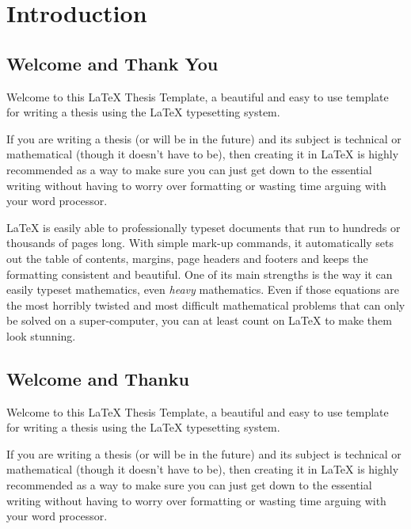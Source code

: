 \chapter{Introduction}\label{ch:chapter1} %



\section{Welcome and Thank You}\label{sec:welcome}
Welcome to this \LaTeX{} Thesis Template, a beautiful and easy to use template for writing a thesis using the \LaTeX{} typesetting system.

If you are writing a thesis (or will be in the future) and its subject is technical or mathematical (though it doesn't have to be), then creating it in \LaTeX{} is highly recommended as a way to make sure you can just get down to the essential writing without having to worry over formatting or wasting time arguing with your word processor.

\LaTeX{} is easily able to professionally typeset documents that run to hundreds or thousands of pages long. With simple mark-up commands, it automatically sets out the table of contents, margins, page headers and footers and keeps the formatting consistent and beautiful. One of its main strengths is the way it can easily typeset mathematics, even \emph{heavy} mathematics. Even if those equations are the most horribly twisted and most difficult mathematical problems that can only be solved on a super-computer, you can at least count on \LaTeX{} to make them look stunning.


\section{Welcome and Thanku}\label{sec:welome}
Welcome to this \LaTeX{} Thesis Template, a beautiful and easy to use template for writing a thesis using the \LaTeX{} typesetting system.

If you are writing a thesis (or will be in the future) and its subject is technical or mathematical (though it doesn't have to be), then creating it in \LaTeX{} is highly recommended as a way to make sure you can just get down to the essential writing without having to worry over formatting or wasting time arguing with your word processor.

